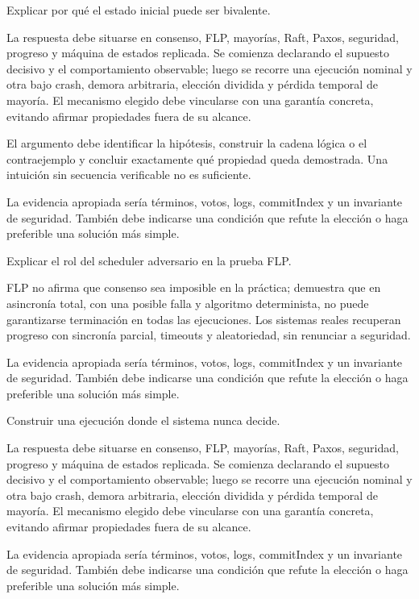 \documentclass[variant=guia,cover=institutional,mode=screen]{ua-engineering-v6-article}
\begin{document}
\begin{uaexercise}
Explicar por qué el estado inicial puede ser bivalente.
\end{uaexercise}
\begin{uaanswer}
La respuesta debe situarse en consenso, FLP, mayorías, Raft, Paxos, seguridad, progreso y máquina de estados replicada. Se comienza declarando el supuesto decisivo y el comportamiento observable; luego se recorre una ejecución nominal y otra bajo crash, demora arbitraria, elección dividida y pérdida temporal de mayoría. El mecanismo elegido debe vincularse con una garantía concreta, evitando afirmar propiedades fuera de su alcance.

El argumento debe identificar la hipótesis, construir la cadena lógica o el contraejemplo y concluir exactamente qué propiedad queda demostrada. Una intuición sin secuencia verificable no es suficiente.

La evidencia apropiada sería términos, votos, logs, commitIndex y un invariante de seguridad. También debe indicarse una condición que refute la elección o haga preferible una solución más simple.
\end{uaanswer}

\begin{uaexercise}
Explicar el rol del scheduler adversario en la prueba FLP.
\end{uaexercise}
\begin{uaanswer}
FLP no afirma que consenso sea imposible en la práctica; demuestra que en asincronía total, con una posible falla y algoritmo determinista, no puede garantizarse terminación en todas las ejecuciones. Los sistemas reales recuperan progreso con sincronía parcial, timeouts y aleatoriedad, sin renunciar a seguridad.

La evidencia apropiada sería términos, votos, logs, commitIndex y un invariante de seguridad. También debe indicarse una condición que refute la elección o haga preferible una solución más simple.
\end{uaanswer}

\begin{uaexercise}
Construir una ejecución donde el sistema nunca decide.
\end{uaexercise}
\begin{uaanswer}
La respuesta debe situarse en consenso, FLP, mayorías, Raft, Paxos, seguridad, progreso y máquina de estados replicada. Se comienza declarando el supuesto decisivo y el comportamiento observable; luego se recorre una ejecución nominal y otra bajo crash, demora arbitraria, elección dividida y pérdida temporal de mayoría. El mecanismo elegido debe vincularse con una garantía concreta, evitando afirmar propiedades fuera de su alcance.

La evidencia apropiada sería términos, votos, logs, commitIndex y un invariante de seguridad. También debe indicarse una condición que refute la elección o haga preferible una solución más simple.
\end{uaanswer}
\end{document}
